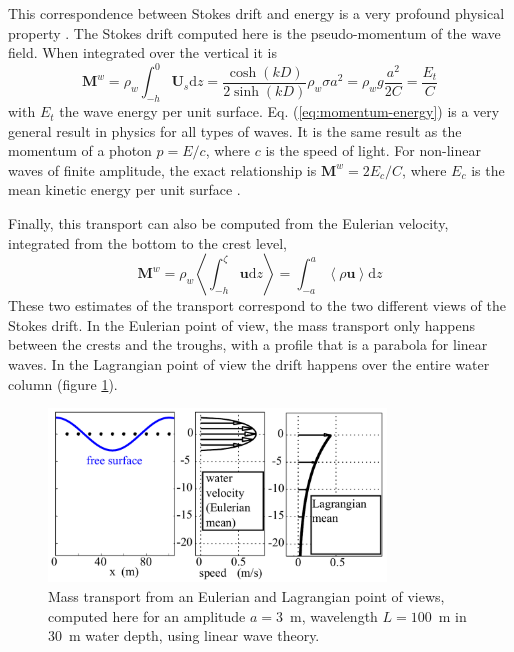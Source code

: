 This correspondence between Stokes drift and energy is a very profound physical property \citep{Andrews&McIntyre1978b}. 
The Stokes drift computed here is the pseudo-momentum of the wave field. When integrated over the vertical it is 
\begin{equation}
    {\mathbf M}^w=\rho_w \int_{-h}^0 {\mathbf U}_s {\mathrm d} z =
    \frac{\cosh (kD)}{2 \sinh (kD)} \rho_w \sigma a^2 = \rho_w g
    \frac{a^2}{2C} =  \frac{E_t}{C} \label{eq:momentum-energy}
\end{equation}
with $E_t$ the wave energy per unit surface. Eq. (\ref{eq:momentum-energy}) is a very general result in physics for all types of waves. 
It is the same result as the momentum of a photon $p=E/c$, where $c$ is the speed of light. For non-linear waves of finite 
amplitude, the exact relationship is ${\mathbf M}^w=2 {E_c}/{C}$, where $E_c$ is the mean kinetic energy per unit surface \citep[][]{Longuet-Higgins1984}.

Finally, this transport can also be computed from the Eulerian velocity, 
integrated from the bottom to the crest level, 
\begin{equation}
    {\mathbf M}^w=\rho_w \left< \int_{-h}^\zeta {\mathbf u} {\mathrm d} z \right> =
    \int_{-a}^a \left< \rho {\mathbf u} \right> {\mathrm d} z
\end{equation}
These two estimates of the transport correspond to the two different views of the Stokes drift. 
In the Eulerian point of view, the mass transport only happens between the crests and the troughs, with a profile that 
is a parabola for linear waves. In the Lagrangian point of view the drift happens over the entire water column (figure \ref{Eul_Lag_drift}).
\begin{figure}
\centerline{\includegraphics[width=0.8\textwidth]{FIGS_CH_MOMENTUM/Eul_Lag_drift_en.pdf}}
  \caption{Mass transport from an Eulerian and Lagrangian point of views, computed here 
for an amplitude $a=3$~m, wavelength $L=100$~m in 30~m water depth, using 
linear wave theory.}
\label{Eul_Lag_drift}
\end{figure}

